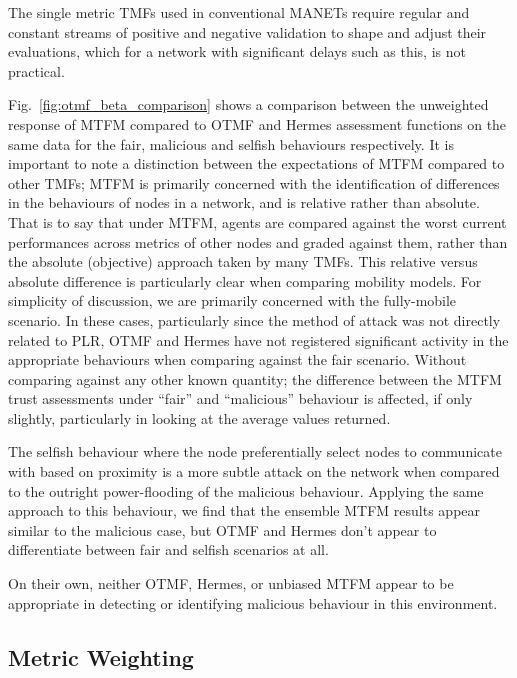 \documentclass[conference]{IEEEtran}
\begin{document}
The single metric TMFs used in conventional MANETs require regular and constant streams of positive and negative validation to shape and adjust their evaluations, which for a network with significant delays such as this, is not practical.

Fig.~\ref{fig:otmf_beta_comparison} shows a comparison between the unweighted response of MTFM compared to OTMF and Hermes assessment functions on the same data for the fair, malicious and selfish behaviours respectively.
It is important to note a distinction between the expectations of MTFM compared to other TMFs; MTFM is primarily concerned with the identification of differences in the behaviours of nodes in a network, and is relative rather than absolute.
That is to say that under MTFM, agents are compared against the worst current performances across metrics of other nodes and graded against them, rather than the absolute (objective) approach taken by many TMFs.
This relative versus absolute difference is particularly clear when comparing mobility models. 
For simplicity of discussion, we are primarily concerned with the fully-mobile scenario.
In these cases, particularly since the method of attack was not directly related to PLR, OTMF and Hermes have not registered significant activity in the appropriate behaviours when comparing against the fair scenario.
Without comparing against any other known quantity; the difference between the MTFM trust assessments under ``fair'' and ``malicious'' behaviour is affected, if only slightly, particularly in looking at the average values returned.

The selfish behaviour where the node preferentially select nodes to communicate with based on proximity is a more subtle attack on the network when compared to the outright power-flooding of the malicious behaviour.
Applying the same approach to this behaviour, we find that the ensemble MTFM results appear similar to the malicious case, but OTMF and Hermes don't appear to differentiate between fair and selfish scenarios at all.

On their own, neither OTMF, Hermes, or unbiased MTFM appear to be appropriate in detecting or identifying malicious behaviour in this environment.


\subsection{Metric Weighting}
%
\end{document}
